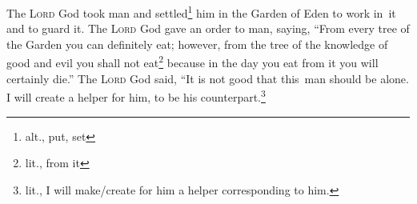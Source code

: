 \begin{inparaenum}
     The \textsc{Lord} God took man and settled\footnote{alt., put, set} him in the Garden of Eden to work in\understood\ it and to guard it.%
     The \textsc{Lord} God gave an order to man, saying, ``From every tree of the Garden you can definitely eat;%
     however, from the tree of the knowledge of good and evil you shall not eat\footnote{lit., from it} because in the day you eat from it you will certainly die.''%
     The \textsc{Lord} God said, ``It is not good that this\understood\ man should be alone. I will create a helper for him, to be his counterpart.\footnote{lit., I will make/create for him a helper corresponding to him.}%
    
\end{inparaenum}
